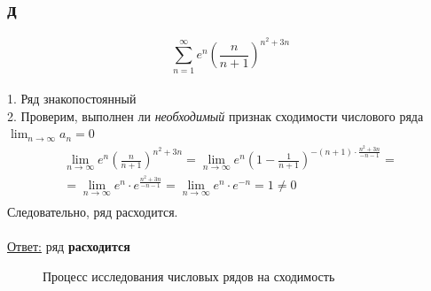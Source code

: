 \documentclass[a5paper, 10pt]{article}
\theoremstyle{definition}
\theoremstyle{plain}
\theoremstyle{remark}
\begin{document}
\subsection{д}
\begin{equation}
\sum \limits_{n = 1}^{\infty} e^n \left( \frac{n}{n+1} \right)^{n^2+3n}
\end{equation}
\\
1. Ряд знакопостоянный\\
2. Проверим, выполнен ли \textit{необходимый} признак сходимости числового ряда $ \lim_{n \to \infty} a_n = 0$
\begin{multline*}
\lim_{n \to \infty} e^n \left( \frac{n}{n+1} \right)^{n^2+3n} =
 \lim_{n \to \infty} e^n \left( 1-\frac{1}{n+1} \right)^{-(n+1) \cdot \frac{n^2+3n}{-n-1}} = \\ =
\lim_{n \to \infty} e^n\cdot e^{ \frac{n^2+3n}{-n-1}}  = \lim_{n \to \infty} e^n\cdot e^{-n} = 1 \neq 0 \\
\end{multline*}
Следовательно, ряд расходится.\\\\
\underline{Ответ:} ряд  \textbf{расходится}

\begin{figure}[h]
	           \caption{Процесс исследования числовых рядов на сходимость}
		
\end{figure}

\newpage
\end{document}
